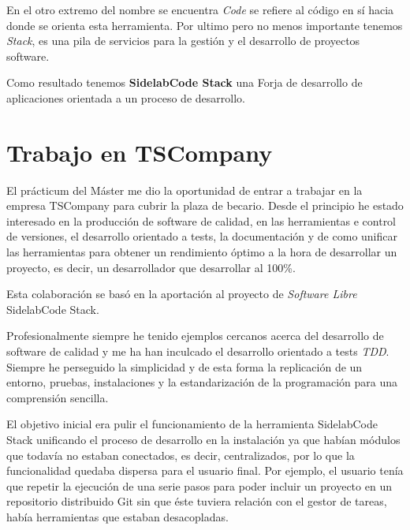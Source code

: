 \par En el otro extremo del nombre se encuentra \emph{Code} se refiere al c\'odigo en s\'i hacia donde se orienta esta herramienta. Por ultimo pero no menos importante tenemos \emph{Stack}, es una pila de servicios para la gesti\'on y el desarrollo de proyectos software.

\par Como resultado tenemos \textbf{SidelabCode Stack} una Forja de desarrollo de aplicaciones orientada a un proceso de desarrollo.


\section{Trabajo en TSCompany}
\label{sec:trabajo-tscompany}

\par El pr\'acticum del M\'aster me dio la oportunidad de entrar a trabajar en la empresa TSCompany para cubrir la plaza de becario. Desde el principio he estado interesado en la producción de software de calidad, en las herramientas e control de versiones, el desarrollo orientado a tests, la documentación y de como unificar las herramientas para obtener un rendimiento óptimo a la hora de desarrollar un proyecto, es decir, un desarrollador que desarrollar al 100\%.

\par Esta colaboraci\'on se bas\'o en la aportaci\'on al proyecto de \emph{Software Libre} SidelabCode Stack.

\par Profesionalmente siempre he tenido ejemplos cercanos acerca del desarrollo de software de calidad y me ha han inculcado el desarrollo orientado a tests \emph{TDD}. Siempre he perseguido la simplicidad y de esta forma la replicaci\'on de un entorno, pruebas, instalaciones y la estandarizaci\'on de la programaci\'on para una comprensi\'on sencilla.

\par El objetivo inicial era pulir el funcionamiento de la herramienta SidelabCode Stack unificando el proceso de desarrollo en la instalaci\'on ya que hab\'ian m\'odulos que todav\'ia no estaban conectados, es decir, centralizados, por lo que la funcionalidad quedaba dispersa para el usuario final. Por ejemplo, el usuario ten\'ia que repetir la ejecución de una serie pasos para poder incluir un proyecto en un repositorio distribuido Git sin que éste tuviera relación con el gestor de tareas, había herramientas que estaban desacopladas.


